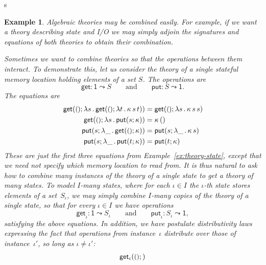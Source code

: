s\documentclass{amsart}
\newcommand{\lam}[1]{\lambda #1 \,.\,}
\newcommand{\opdecl}[3]{#1 : #2 \leadsto #3} %
\newcommand{\one}{\mathsf{1}} %
\newcommand{\unit}{{\text{\small$()$}}} %
\newcommand{\kode}[1]{\mathsf{#1}}
\newcommand{\opcall}[3]{\kode{#1}(#2; #3)}
\newtheorem{example}[definition]{Example}
\begin{document}
\begin{example}
  \label{ex:theory-single-state}
  Algebraic theories may be combined easily. For example, if we want a theory
  describing state and I/O we may simply adjoin the signatures and equations of
  both theories to obtain their combination.

  Sometimes we want to combine theories so that the operations between them
  interact. To demonstrate this, let us consider the theory of a single stateful
  memory location holding elements of a set $S$. The operations are
  \begin{equation*}
    \opdecl{\kode{get}}{\one}{S}
    \qquad\text{and}\qquad
    \opdecl{\kode{put}}{S}{\one}.
  \end{equation*}
  The equations are
  \begin{align*}
    \opcall{get}{\unit}{
      \lam{s}{
        \opcall{get}{\unit}{
        \lam{t} \kappa \, s \, t}
      }
    } &=
    \opcall{get}{\unit}{\lam{s}{\kappa \, s \, s}}
    \\
    \opcall{get}{\unit}{
      \lam{s} \opcall{put}{s}{\kappa}
    } &=
    \kappa \, ()
    \\
    \opcall{put}{s}{
      \lam{\_} \opcall{get}{\unit}{\kappa}
    } &=
    \opcall{put}{s}{\lam{\_} \kappa \, s}
    \\
    \opcall{put}{s}{
      \lam{\_} \opcall{put}{t}{\kappa}
    } &=
    \opcall{put}{t}{\kappa}
  \end{align*}
  These are just the first three equations from Example~\ref{ex:theory-state},
  except that we need not specify which memory location to read from. It is thus
  natural to ask how to combine many instances of the theory of a single state
  to get a theory of many states. To model $I$-many states, where for each
  $\iota \in I$ the $\iota$-th state stores elements of a set~$S_\iota$, we may
  simply combine $I$-many copies of the theory of a single state, so that for
  every $\iota \in I$ we have operations
  \begin{equation*}
    \opdecl{\kode{get}_\iota}{\one}{S_\iota}
    \qquad\text{and}\qquad
    \opdecl{\kode{put}_\iota}{S_\iota}{\one},
  \end{equation*}
  satisfying the above equations. In addition, we have postulate
  \emph{distributivity} laws expressing the fact that operations from
  instance~$\iota$ distribute over those of instance~$\iota'$, so long as
  $\iota \neq \iota'$:
  \begin{align*}
    \opcall{get_\iota}{\unit}{
}
\end{align*}
\end{example}
\end{document}
